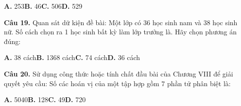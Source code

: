 \documentclass[11pt,a4paper]{article}
\begin{document}
\hspace*{1.5em}\textbf{A.} 253\quad\quad \textbf{B.} 46\quad\quad \textbf{C.} 506\quad\quad \textbf{D.} 529\par\vspace{2pt}
\textbf{\color{primary} Câu 19.} Quan sát dữ kiện đề bài: Một lớp có 36 học sinh nam và 38 học sinh nữ. Số cách chọn ra 1 học sinh bất kỳ làm lớp trưởng là. Hãy chọn phương án đúng:\par
\hspace*{1.5em}\textbf{A.} 38 cách\quad\quad \textbf{B.} 1368 cách\quad\quad \textbf{C.} 74 cách\quad\quad \textbf{D.} 36 cách\par\vspace{2pt}
\textbf{\color{primary} Câu 20.} Sử dụng công thức hoặc tính chất đầu bài của Chương VIII để giải quyết yêu cầu: Số các hoán vị của một tập hợp gồm 7 phần tử phân biệt là:\par
\hspace*{1.5em}\textbf{A.} 5040\quad\quad \textbf{B.} 128\quad\quad \textbf{C.} 49\quad\quad \textbf{D.} 720\par\vspace{2pt}
\end{document}
